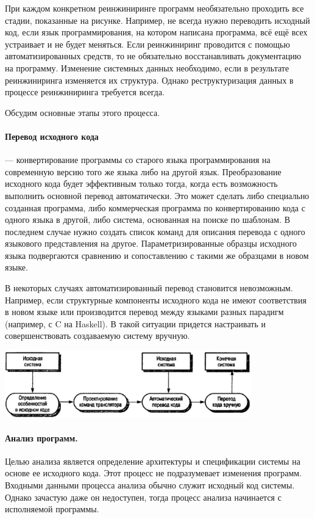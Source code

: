 \documentclass{../../text-style}
\begin{document}
При каждом конкретном реинжиниринге программ необязательно проходить все стадии, показанные на рисунке. Например, не всегда нужно переводить исходный код, если язык программирования, на котором написана программа, всё ещё всех устраивает и не будет меняться. Если реинжиниринг проводится с помощью автоматизированных средств, то не обязательно восстанавливать документацию на программу. Изменение системных данных необходимо, если в результате реинжиниринга изменяется их структура. Однако реструктуризация данных в процессе реинжиниринга требуется всегда.

Обсудим основные этапы этого процесса.

\paragraph{Перевод исходного кода} --- конвертирование программы со старого языка программирования на современную версию того же языка либо на другой язык. Преобразование исходного кода будет эффективным только тогда, когда есть возможность выполнить основной перевод автоматически. Это может сделать либо специально созданная программа, либо коммерческая программа по конвертированию кода с одного языка в другой, либо система, основанная на поиске по шаблонам. В последнем случае нужно создать список команд для описания перевода с одного языкового представления на другое. Параметризированные образцы исходного языка подвергаются сравнению и сопоставлению с такими же образцами в новом языке.

В некоторых случаях автоматизированный перевод становится невозможным. Например, если структурные компоненты исходного кода не имеют соответствия в новом языке или производится перевод между языками разных парадигм (например, с C на Haskell). В такой ситуации придется настраивать и совершенствовать создаваемую систему вручную.

\begin{center}
    \includegraphics[width=0.8\textwidth]{sourceCodeTranslation.png}
\end{center}

\paragraph{Анализ программ.} Целью анализа является определение архитектуры и спецификации системы на основе ее исходного кода. Этот процесс не подразумевает изменения программ. Входными данными процесса анализа обычно служит исходный код системы. Однако зачастую даже он недоступен, тогда процесс анализа начинается с исполняемой программы. 
\end{document}
